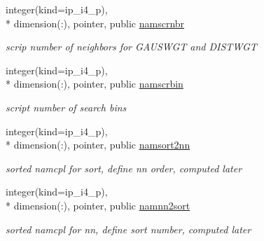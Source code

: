 \begin{DoxyCompactItemize}
integer(kind=ip\+\_\+i4\+\_\+p), \\*
dimension(\+:), pointer, public \hyperlink{classmod__oasis__namcouple_a20d614468823744b82118ee8cf2df852}{namscrnbr}
\begin{DoxyCompactList}\small\item\em scrip number of neighbors for G\+A\+U\+S\+W\+G\+T and D\+I\+S\+T\+W\+G\+T \end{DoxyCompactList}\item 
integer(kind=ip\+\_\+i4\+\_\+p), \\*
dimension(\+:), pointer, public \hyperlink{classmod__oasis__namcouple_a728405e8f669b58d00c189abf8b62437}{namscrbin}
\begin{DoxyCompactList}\small\item\em script number of search bins \end{DoxyCompactList}\item 
integer(kind=ip\+\_\+i4\+\_\+p), \\*
dimension(\+:), pointer, public \hyperlink{classmod__oasis__namcouple_a4555b14f38928b7f0fb7f77b9c42d0a0}{namsort2nn}
\begin{DoxyCompactList}\small\item\em sorted namcpl for sort, define nn order, computed later \end{DoxyCompactList}\item 
integer(kind=ip\+\_\+i4\+\_\+p), \\*
dimension(\+:), pointer, public \hyperlink{classmod__oasis__namcouple_a0ace7c451d8658759b9c8d871926a76e}{namnn2sort}
\begin{DoxyCompactList}\small\item\em sorted namcpl for nn, define sort number, computed later \end{DoxyCompactList}\end{DoxyCompactItemize}
